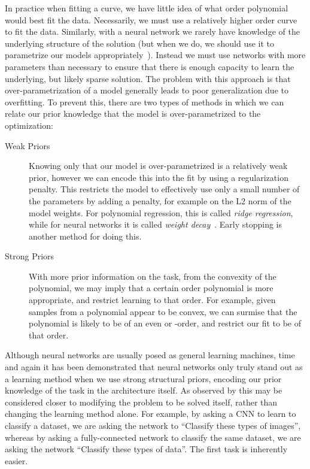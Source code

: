 \documentclass[thesis]{subfiles}
\begin{document}
	In practice when fitting a curve, we have little idea of what order polynomial would best fit the data. Necessarily, we must use a relatively higher order curve to fit the data. Similarly, with a neural network we rarely have knowledge of the underlying structure of the solution (but when we do, we should use it to parametrize our models appropriately~\citep{jain2016structural}). Instead we must use networks with more parameters than necessary to ensure that there is enough capacity to learn the underlying, but likely sparse solution. The problem with this approach is that over-parametrization of a model generally leads to poor generalization due to overfitting. To prevent this, there are two types of methods in which we can relate our prior knowledge that the model is over-parametrized to the optimization:
	\begin{description}
	\item[Weak Priors]
	Knowing only that our model is over-parametrized is a relatively weak prior, however we can encode this into the fit by using a regularization penalty. This restricts the model to effectively use only a small number of the parameters by adding a penalty, for example on the L2 norm of the model weights. For polynomial regression, this is called \emph{ridge regression}, while for neural networks it is called \emph{weight decay}~\citep{hinton1987learning}. Early stopping is another method for doing this.
	
	\item[Strong Priors]
	With more prior information on the task, \eg from the convexity of the polynomial, we may imply that a certain order polynomial is more appropriate, and restrict learning to that order. For example, given samples from a polynomial appear to be convex, we can surmise that the polynomial is likely to be of an even or -order, and restrict our fit to be of that order. 
    \end{description}
    
	Although neural networks are usually posed as general learning machines, time and again it has been demonstrated that neural networks only truly stand out as a learning method when we use strong structural priors, encoding our prior knowledge of the task in the architecture itself. As observed by \citet{denker1987large} this may be considered closer to modifying the problem to be solved itself, rather than changing the learning method alone. For example, by asking a CNN to learn to classify a dataset, we are asking the network to ``Classify these types of images'', whereas by asking a fully-connected network to classify the same dataset, we are asking the network ``Classify these types of data''. The first task is inherently easier.
\end{document}
